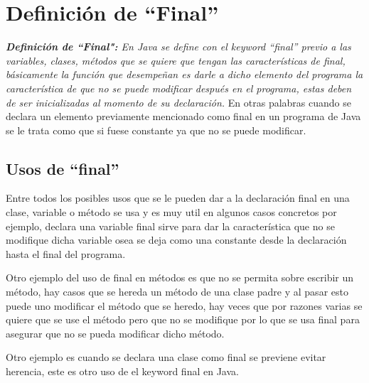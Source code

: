 \documentclass{article}
\begin{document}


\section{Definición de ``Final''}
\emph{\textbf{Definición de ``Final":} En Java se define con el keyword ``final'' previo a las variables, clases, métodos que se quiere que tengan las características de final, básicamente la función que desempeñan es darle a dicho elemento del programa la característica de que no se puede modificar después en el programa, estas deben de ser inicializadas al momento de su declaración. } En otras palabras cuando se declara un elemento previamente mencionado como final en un programa de Java se le trata como que si fuese constante ya que no se puede modificar.

\subsection{Usos de ``final''}
Entre todos los posibles usos que se le pueden dar a la declaración final en una clase, variable o método se usa y es muy util en algunos casos concretos por ejemplo, declara una variable final sirve para dar la característica que no se modifique dicha variable osea se deja como una constante desde la declaración hasta el final del programa. \newline 

Otro ejemplo del uso de final en métodos es que no se permita sobre escribir un método, hay casos que se hereda un método de una clase padre y al pasar esto puede uno modificar el método que se heredo, hay veces que por razones varias se quiere que se use el método pero que no se modifique por lo que se usa final para asegurar que no se pueda modificar dicho método. \newline 

Otro ejemplo es cuando se declara una clase como final se previene evitar herencia, este es otro uso de el keyword final en Java.
\end{document}
